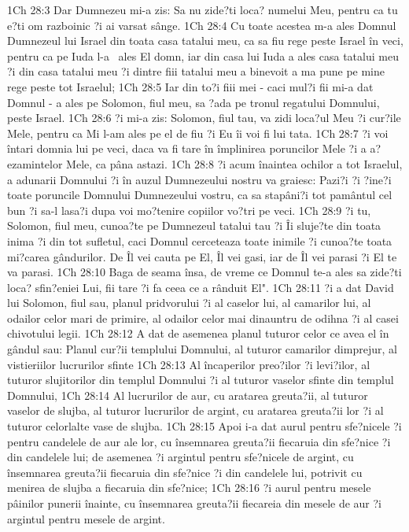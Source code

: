1Ch 28:3  Dar Dumnezeu mi-a zis: Sa nu zide?ti loca? numelui Meu, pentru ca tu e?ti om razboinic ?i ai varsat sânge.
1Ch 28:4  Cu toate acestea m-a ales Domnul Dumnezeul lui Israel din toata casa tatalui meu, ca sa fiu rege peste Israel în veci, pentru ca pe Iuda l-a  ales El domn, iar din casa lui Iuda a ales casa tatalui meu ?i din casa tatalui meu ?i dintre fiii tatalui meu a binevoit a ma pune pe mine rege peste tot Israelul;
1Ch 28:5  Iar din to?i fiii mei - caci mul?i fii mi-a dat Domnul - a ales pe Solomon, fiul meu, sa ?ada pe tronul regatului Domnului, peste Israel.
1Ch 28:6  ?i mi-a zis: Solomon, fiul tau, va zidi loca?ul Meu ?i cur?ile Mele, pentru ca Mi l-am ales pe el de fiu ?i Eu îi voi fi lui tata.
1Ch 28:7  ?i voi întari domnia lui pe veci, daca va fi tare în împlinirea poruncilor Mele ?i a a?ezamintelor Mele, ca pâna astazi.
1Ch 28:8  ?i acum înaintea ochilor a tot Israelul, a adunarii Domnului ?i în auzul Dumnezeului nostru va graiesc: Pazi?i ?i ?ine?i toate poruncile Domnului Dumnezeului vostru, ca sa stapâni?i tot pamântul cel bun ?i sa-l lasa?i dupa voi mo?tenire copiilor vo?tri pe veci.
1Ch 28:9  ?i tu, Solomon, fiul meu, cunoa?te pe Dumnezeul tatalui tau ?i Îi sluje?te din toata inima ?i din tot sufletul, caci Domnul cerceteaza toate inimile ?i cunoa?te toata mi?carea gândurilor. De Îl vei cauta pe El, Îl vei gasi, iar de Îl vei parasi ?i El te va parasi.
1Ch 28:10  Baga de seama însa, de vreme ce Domnul te-a ales sa zide?ti loca? sfin?eniei Lui, fii tare ?i fa ceea ce a rânduit El".
1Ch 28:11  ?i a dat David lui Solomon, fiul sau, planul pridvorului ?i al caselor lui, al camarilor lui, al odailor celor mari de primire, al odailor celor mai dinauntru de odihna ?i al casei chivotului legii.
1Ch 28:12  A dat de asemenea planul tuturor celor ce avea el în gândul sau: Planul cur?ii templului Domnului, al tuturor camarilor dimprejur, al vistieriilor lucrurilor sfinte
1Ch 28:13  Al încaperilor preo?ilor ?i levi?ilor, al tuturor slujitorilor din templul Domnului ?i al tuturor vaselor sfinte din templul Domnului,
1Ch 28:14  Al lucrurilor de aur, cu aratarea greuta?ii, al tuturor vaselor de slujba, al tuturor lucrurilor de argint, cu aratarea greuta?ii lor ?i al tuturor celorlalte vase de slujba.
1Ch 28:15  Apoi i-a dat aurul pentru sfe?nicele ?i pentru candelele de aur ale lor, cu însemnarea greuta?ii fiecaruia din sfe?nice ?i din candelele lui; de asemenea ?i argintul pentru sfe?nicele de argint, cu însemnarea greuta?ii fiecaruia din sfe?nice ?i din candelele lui, potrivit cu menirea de slujba a fiecaruia din sfe?nice;
1Ch 28:16  ?i aurul pentru mesele pâinilor punerii înainte, cu însemnarea greuta?ii fiecareia din mesele de aur ?i argintul pentru mesele de argint.
